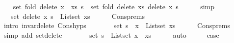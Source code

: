 \begin{isabellebody}
\ \ \isamarkupfalse%
\ {\isachardoublequoteopen}set\ {\isacharparenleft}{\kern0pt}fold\ delete\ {\isacharparenleft}{\kern0pt}x\ {\isacharhash}{\kern0pt}\ xs{\isacharparenright}{\kern0pt}\ s{\isacharparenright}{\kern0pt}\ {\isacharequal}{\kern0pt}\ set\ {\isacharparenleft}{\kern0pt}fold\ delete\ xs\ {\isacharparenleft}{\kern0pt}delete\ x\ s{\isacharparenright}{\kern0pt}{\isacharparenright}{\kern0pt}{\isachardoublequoteclose}\isanewline
\ \ \ \ \isamarkupfalse%
\ simp\isanewline
\ \ \isamarkupfalse%
\ \isamarkupfalse%
\ {\isachardoublequoteopen}{\isachardot}{\kern0pt}{\isachardot}{\kern0pt}{\isachardot}{\kern0pt}\ {\isacharequal}{\kern0pt}\ set\ {\isacharparenleft}{\kern0pt}delete\ x\ s{\isacharparenright}{\kern0pt}\ {\isacharminus}{\kern0pt}\ List{\isachardot}{\kern0pt}set\ xs{\isachardoublequoteclose}\isanewline
\ \ \ \ \isamarkupfalse%
\ Cons{\isachardot}{\kern0pt}prems\isanewline
\ \ \ \ \isamarkupfalse%
\ {\isacharparenleft}{\kern0pt}intro\ invar{\isacharunderscore}{\kern0pt}delete\ Cons{\isachardot}{\kern0pt}hyps{\isacharparenright}{\kern0pt}\isanewline
\ \ \isamarkupfalse%
\ \isamarkupfalse%
\ {\isachardoublequoteopen}{\isachardot}{\kern0pt}{\isachardot}{\kern0pt}{\isachardot}{\kern0pt}\ {\isacharequal}{\kern0pt}\ set\ s\ {\isacharminus}{\kern0pt}\ {\isacharbraceleft}{\kern0pt}x{\isacharbraceright}{\kern0pt}\ {\isacharminus}{\kern0pt}\ List{\isachardot}{\kern0pt}set\ xs{\isachardoublequoteclose}\isanewline
\ \ \ \ \isamarkupfalse%
\ Cons{\isachardot}{\kern0pt}prems\isanewline
\ \ \ \ \isamarkupfalse%
\ {\isacharparenleft}{\kern0pt}simp\ add{\isacharcolon}{\kern0pt}\ set{\isacharunderscore}{\kern0pt}delete{\isacharparenright}{\kern0pt}\isanewline
\ \ \isamarkupfalse%
\ \isamarkupfalse%
\ {\isachardoublequoteopen}{\isachardot}{\kern0pt}{\isachardot}{\kern0pt}{\isachardot}{\kern0pt}\ {\isacharequal}{\kern0pt}\ set\ s\ {\isacharminus}{\kern0pt}\ List{\isachardot}{\kern0pt}set\ {\isacharparenleft}{\kern0pt}x\ {\isacharhash}{\kern0pt}\ xs{\isacharparenright}{\kern0pt}{\isachardoublequoteclose}\isanewline
\ \ \ \ \isamarkupfalse%
\ auto\isanewline
\ \ \isamarkupfalse%
\ \isamarkupfalse%
\ {\isacharquery}{\kern0pt}case\isanewline
\ \ \ \ \isacommand{{\isachardot}{\kern0pt}}\isamarkupfalse%
\isanewline
{}\isamarkupfalse%
%
\endisatagproof
{\isafoldproof}%
%
\isadelimproof
\isanewline
%
\endisadelimproof

\end{isabellebody}
